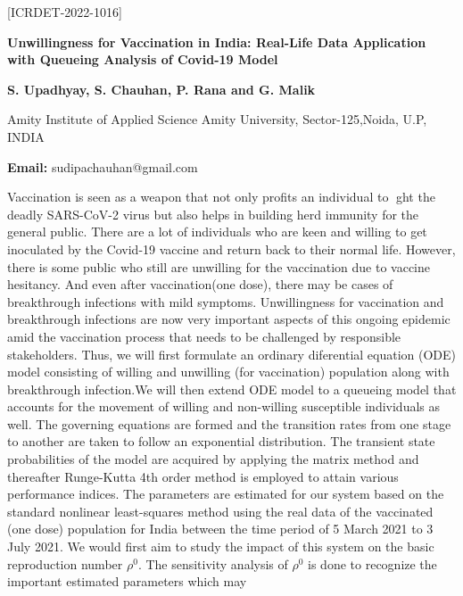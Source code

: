 \documentclass[twoside,11pt]{amsart}
\begin{document}
\vskip 5mm
\begin{flushleft}
\centerline{[ICRDET-2022-1016]}
\end{flushleft}
\begin{center}\bf\LARGE
Unwillingness for Vaccination in India: Real-Life
Data Application with Queueing Analysis of
Covid-19 Model
\end{center}
\vskip 5mm

\centerline{\textbf{S. Upadhyay, S. Chauhan, P. Rana and G. Malik  }}
\vskip 2mm
\begin{flushleft}
Amity Institute of Applied Science
Amity University, Sector-125,Noida, U.P, INDIA
\vskip 2mm
\end{flushleft}
\vskip 2mm
\begin{flushleft}
{\bf Email:} sudipachauhan@gmail.com
\end{flushleft}
\vskip 5mm
Vaccination is seen as a weapon that not only profits an individual
to ght the deadly SARS-CoV-2 virus but also helps in building herd immunity
for the general public. There are a lot of individuals who are keen and willing
to get inoculated by the Covid-19 vaccine and return back to their normal
life. However, there is some public who still are unwilling for the vaccination
due to vaccine hesitancy. And even after vaccination(one dose), there may
be cases of breakthrough infections with mild symptoms. Unwillingness for
vaccination and breakthrough infections are now very important aspects of this
ongoing epidemic amid the vaccination process that needs to be challenged by
responsible stakeholders.
\newpage
 Thus, we will first formulate an ordinary diferential
equation (ODE) model consisting of willing and unwilling (for vaccination)
population along with breakthrough infection.We will then extend ODE model
to a queueing model that accounts for the movement of willing and non-willing
susceptible individuals as well. The governing equations are formed and the
transition rates from one stage to another are taken to follow an exponential
distribution. The transient state probabilities of the model are acquired by
applying the matrix method and thereafter Runge-Kutta 4th order method is
employed to attain various performance indices. The parameters are estimated
for our system based on the standard nonlinear least-squares method using the
real data of the vaccinated (one dose) population for India between the time
period of 5 March 2021 to 3 July 2021. We would first aim to study the impact
of this system on the basic reproduction number ${\rho}^0$. The sensitivity analysis
of  ${\rho}^0$ is done to recognize the important estimated parameters which may
\end{document}
